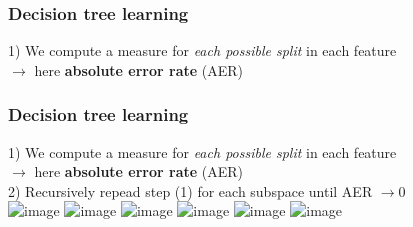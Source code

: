 \documentclass{beamer}
\begin{document}
\begin{frame}
    \frametitle{Decision tree learning}
    1) We compute a measure for \emph{each possible split} in each feature\\\hspace*{5mm}$\to$ here \textbf{absolute error rate} (AER)
    \\
    \vspace*{3mm}
    \centering{}
 
\end{frame}


\begin{frame}
    \frametitle{Decision tree learning}
    1) We compute a measure for \emph{each possible split} in each feature\\\hspace*{5mm}$\to$ here \textbf{absolute error rate} (AER)\\
    2) Recursively repead step (1) for each subspace until AER $\to 0$
    \\
    \vspace*{3mm}
    \centering\includegraphics<1>[height=4.3cm,keepaspectratio]{pics/DT_1_split.png}%
    \centering\includegraphics<2>[height=4.6cm,keepaspectratio]{pics/DT_2_split.png}%
    \centering\includegraphics<3>[height=4.6cm,keepaspectratio]{pics/DT_3_split.png}%
    \centering\includegraphics<4>[height=4.6cm,keepaspectratio]{pics/DT_4_split.png}%
    \centering\includegraphics<5>[height=4.6cm,keepaspectratio]{pics/DT_5_split.png}%
    \centering\includegraphics<6>[height=4.3cm,keepaspectratio]{pics/DT_final.png}%
     
\end{frame}
\end{document}
